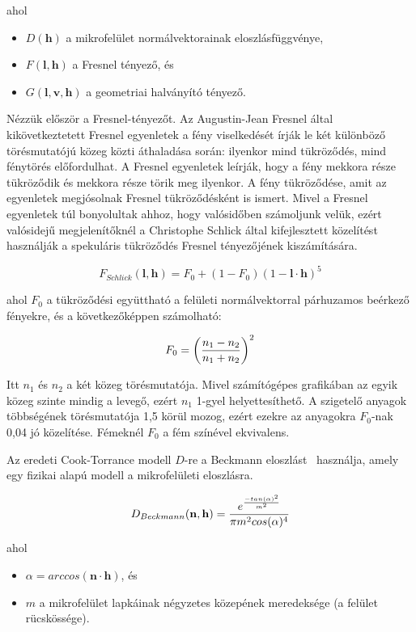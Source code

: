 ahol

\begin{itemize}[noitemsep]
\item \(D(\mathbf{h})\) a mikrofelület normálvektorainak eloszlásfüggvénye,
\item \(F(\mathbf{l}, \mathbf{h})\) a Fresnel tényező, és
\item \(G(\mathbf{l}, \mathbf{v}, \mathbf{h})\) a geometriai halványító tényező.
\end{itemize}

Nézzük először a Fresnel-tényezőt. Az Augustin-Jean Fresnel által kikövetkeztetett Fresnel egyenletek a fény viselkedését írják le két különböző törésmutatójú közeg közti áthaladása során: ilyenkor mind tükröződés, mind fénytörés előfordulhat. A Fresnel egyenletek leírják, hogy a fény mekkora része tükröződik és mekkora része törik meg ilyenkor. A fény tükröződése, amit az egyenletek megjósolnak Fresnel tükröződésként is ismert. Mivel a Fresnel egyenletek túl bonyolultak ahhoz, hogy valósidőben számoljunk velük, ezért valósidejű megjelenítőknél a Christophe Schlick által kifejlesztett közelítést használják a spekuláris tükröződés Fresnel tényezőjének kiszámítására.~\cite{schlick1994inexpensive}

\[
F_{Schlick}(\mathbf{l}, \mathbf{h}) = F_0 + (1 - F_0)(1 - \mathbf{l} \cdot \mathbf{h})^5
\]

ahol \(F_0\) a tükröződési együttható a felületi normálvektorral párhuzamos beérkező fényekre, és a következőképpen számolható:

\[
F_0 = \left( {n_1 - n_2} \over {n_1 + n_2} \right)^2
\]

Itt \(n_1\) és \(n_2\) a két közeg törésmutatója. Mivel számítógépes grafikában az egyik közeg szinte mindig a levegő, ezért \(n_1\) 1-gyel helyettesíthető. A szigetelő anyagok többségének törésmutatója 1,5 körül mozog, ezért ezekre az anyagokra \(F_0\)-nak 0,04 jó közelítése. Fémeknél \(F_0\) a fém színével ekvivalens.

Az eredeti Cook-Torrance modell \(D\)-re a Beckmann eloszlást~\cite{beckmann1987scattering} használja, amely egy fizikai alapú modell a mikrofelületi eloszlásra.

\[
D_{Beckmann}(\mathbf{n}, \mathbf{h}) = { { e^{ -tan(\alpha)^2 \over m^2 } } \over { \pi m^2 cos(\alpha)^4 } }
\]

ahol

\begin{itemize}[noitemsep]
\item \(\alpha = arccos(\mathbf{n} \cdot \mathbf{h})\), és
\item \(m\) a mikrofelület lapkáinak négyzetes közepének meredeksége (a felület rücskössége).
\end{itemize}

